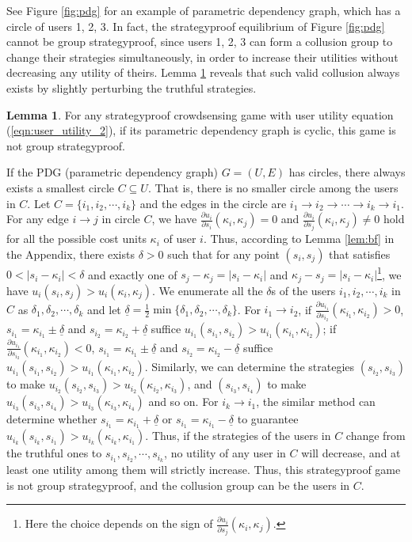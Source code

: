 \documentclass[conference]{IEEEtran}
\theoremstyle{definition}
\newtheorem{lemma}{Lemma}
\begin{document}
See Figure \ref{fig:pdg} for an example of parametric dependency graph, which has a circle of users 1, 2, 3. In fact, the strategyproof equilibrium of Figure \ref{fig:pdg} cannot be group strategyproof, since users 1, 2, 3 can form a collusion group to change their strategies simultaneously, in order to increase their utilities without decreasing any utility of theirs. Lemma \ref{lem:necessity} reveals that such valid collusion always exists by slightly perturbing the truthful strategies.
\begin{lemma}
\label{lem:necessity}
For any strategyproof crowdsensing game with user utility equation (\ref{eqn:user_utility_2}), if its parametric dependency graph is cyclic, this game is not group strategyproof.
\end{lemma}
\begin{IEEEproof}
If the PDG (parametric dependency graph) $G=(U,E)$ has circles, there always exists a smallest circle $C\subseteq U$. That is, there is no smaller circle among the users in $C$. Let $C=\{i_1,i_2,\cdots,i_k\}$ and the edges in the circle are $i_1\to i_2\to\cdots\to i_k\to i_1$. For any edge $i\to j$ in circle $C$, we have $\frac{\partial u_i}{\partial s_i}(\kappa_i,\kappa_j)=0$ and $\frac{\partial u_i}{\partial s_j}(\kappa_i,\kappa_j)\not=0$ hold for all the possible cost units $\kappa_i$ of user $i$. Thus, according to Lemma \ref{lem:bf} in the Appendix, there exists $\delta > 0$ such that for any point $(s_i,s_j)$ that satisfies $0<|s_i-\kappa_i|<\delta$ and exactly one of $s_j-\kappa_j=|s_i-\kappa_i|$ and $\kappa_j-s_j=|s_i-\kappa_i|$\footnote{Here the choice depends on the sign of $\frac{\partial u_i}{\partial s_j}(\kappa_i,\kappa_j)$.}, we have $u_i(s_i,s_j)>u_i(\kappa_i,\kappa_j)$. We enumerate all the $\delta$s of the users $i_1,i_2,\cdots,i_k$ in $C$ as $\delta_1,\delta_2,\cdots,\delta_k$ and let $\underline{\delta}=\frac{1}{2}\min\{\delta_1,\delta_2,\cdots,\delta_k\}$. For $i_1\to i_2$, if $\frac{\partial u_{i_1}}{\partial s_{i_2}}(\kappa_{i_1},\kappa_{i_2})>0$, $s_{i_1}=\kappa_{i_1}\pm \underline{\delta}$ and $s_{i_2}=\kappa_{i_2}+\underline{\delta}$ suffice $u_{i_1}(s_{i_1},s_{i_2})>u_{i_1}(\kappa_{i_1},\kappa_{i_2})$; if $\frac{\partial u_{i_1}}{\partial s_{i_2}}(\kappa_{i_1},\kappa_{i_2})<0$, $s_{i_1}=\kappa_{i_1}\pm \underline{\delta}$ and $s_{i_2}=\kappa_{i_2}-\underline{\delta}$ suffice $u_{i_1}(s_{i_1},s_{i_2})>u_{i_1}(\kappa_{i_1},\kappa_{i_2})$. Similarly, we can determine the strategies $(s_{i_2},s_{i_3})$ to make $u_{i_2}(s_{i_2},s_{i_3})>u_{i_2}(\kappa_{i_2},\kappa_{i_3})$, and $(s_{i_3},s_{i_4})$ to make $u_{i_3}(s_{i_3},s_{i_4})>u_{i_3}(\kappa_{i_3},\kappa_{i_4})$ and so on. For $i_k\to i_1$, the similar method can determine whether $s_{i_1}=\kappa_{i_1} + \underline{\delta}$ or $s_{i_1}=\kappa_{i_1} - \underline{\delta}$ to guarantee $u_{i_k}(s_{i_k},s_{i_1})>u_{i_k}(\kappa_{i_k},\kappa_{i_1})$. Thus, if the strategies of the users in $C$ change from the truthful ones to $s_{i_1},s_{i_2},\cdots,s_{i_k}$, no utility of any user in $C$ will decrease, and at least one utility among them will strictly increase. Thus, this strategyproof game is not group strategyproof, and the collusion group can be the users in $C$.
\end{IEEEproof}
\end{document}
